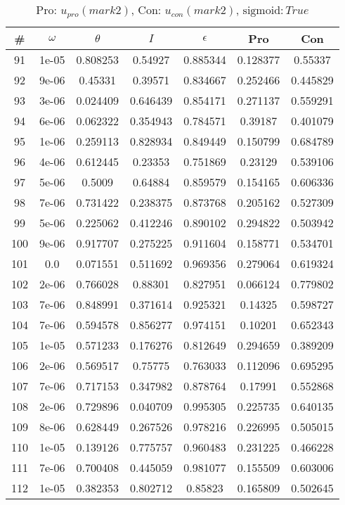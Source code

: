 \begin{table}
\caption{Pro: $u_{pro} (mark 2)$, Con: $u_{con} (mark 2)$, $\mathrm{sigmoid}: True$}
\begin{tabular*}{\linewidth}{c|c|c|c|c|c|c}
\# & $\omega$ & $\theta$ & $I$ & $\epsilon$ & Pro & Con \\
\hline
91 & 1e-05 & 0.808253 & 0.54927 & 0.885344 & 0.128377 & 0.55337\\
92 & 9e-06 & 0.45331 & 0.39571 & 0.834667 & 0.252466 & 0.445829\\
93 & 3e-06 & 0.024409 & 0.646439 & 0.854171 & 0.271137 & 0.559291\\
94 & 6e-06 & 0.062322 & 0.354943 & 0.784571 & 0.39187 & 0.401079\\
95 & 1e-06 & 0.259113 & 0.828934 & 0.849449 & 0.150799 & 0.684789\\
96 & 4e-06 & 0.612445 & 0.23353 & 0.751869 & 0.23129 & 0.539106\\
97 & 5e-06 & 0.5009 & 0.64884 & 0.859579 & 0.154165 & 0.606336\\
98 & 7e-06 & 0.731422 & 0.238375 & 0.873768 & 0.205162 & 0.527309\\
99 & 5e-06 & 0.225062 & 0.412246 & 0.890102 & 0.294822 & 0.503942\\
100 & 9e-06 & 0.917707 & 0.275225 & 0.911604 & 0.158771 & 0.534701\\
101 & 0.0 & 0.071551 & 0.511692 & 0.969356 & 0.279064 & 0.619324\\
102 & 2e-06 & 0.766028 & 0.88301 & 0.827951 & 0.066124 & 0.779802\\
103 & 7e-06 & 0.848991 & 0.371614 & 0.925321 & 0.14325 & 0.598727\\
104 & 7e-06 & 0.594578 & 0.856277 & 0.974151 & 0.10201 & 0.652343\\
105 & 1e-05 & 0.571233 & 0.176276 & 0.812649 & 0.294659 & 0.389209\\
106 & 2e-06 & 0.569517 & 0.75775 & 0.763033 & 0.112096 & 0.695295\\
107 & 7e-06 & 0.717153 & 0.347982 & 0.878764 & 0.17991 & 0.552868\\
108 & 2e-06 & 0.729896 & 0.040709 & 0.995305 & 0.225735 & 0.640135\\
109 & 8e-06 & 0.628449 & 0.267526 & 0.978216 & 0.226995 & 0.505015\\
110 & 1e-05 & 0.139126 & 0.775757 & 0.960483 & 0.231225 & 0.466228\\
111 & 7e-06 & 0.700408 & 0.445059 & 0.981077 & 0.155509 & 0.603006\\
112 & 1e-05 & 0.382353 & 0.802712 & 0.85823 & 0.165809 & 0.502645\\

\end{tabular*}
\end{table}
